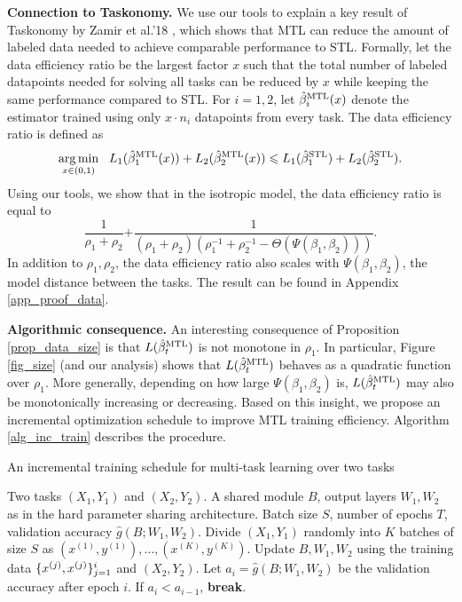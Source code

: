 \textbf{Connection to Taskonomy.} We use our tools to explain a key result of Taskonomy by Zamir et al.'18 \cite{ZSSGM18}, which shows that MTL can reduce the amount of labeled data needed to achieve comparable performance to STL.
Formally, let the data efficiency ratio be the largest factor $x$ such that the total number of labeled datapoints needed for solving all tasks can be reduced by $x$ while keeping the same performance compared to STL.
For $i = 1, 2$, let $\hat{\beta}_i^{\text{MTL}}(x)$ denote the estimator trained using only $x \cdot n_i$ datapoints from every task.
The data efficiency ratio is defined as
\[ \operatorname*{arg\,min}_{x\in(0, 1)} ~~
		L_1(\hat{\beta}_1^{\text{MTL}}(x)) + L_2(\hat{\beta}_2^{\text{MTL}}(x))
		\leqslant L_1(\hat{\beta}_1^{\text{STL}}) + L_2(\hat{\beta}_2^{\text{STL}}). \]
Using our tools, we show that in the isotropic model, the data efficiency ratio is
equal to \[ \frac{1}{\rho_1 + \rho_2} {+ \frac{1}{(\rho_1 +\rho_2)(\rho_1^{-1} + \rho_2^{-1} - \Theta(\Psi(\beta_1, \beta_2)))}}. \]
In addition to $\rho_1,\rho_2$, the data efficiency ratio also scales with $\Psi(\beta_1, \beta_2)$, the model distance between the tasks.
The result can be found in Appendix \ref{app_proof_data}.

\textbf{Algorithmic consequence.} An interesting consequence of Proposition \ref{prop_data_size} is that $L(\hat{\beta}_t^{\text{MTL}})$ is not monotone in $\rho_1$.
In particular, Figure \ref{fig_size} (and our analysis) shows that $L(\hat{\beta}_t^{\text{MTL}})$ behaves as a quadratic function over $\rho_1$.
More generally, depending on how large $\Psi(\beta_1, \beta_2)$ is, $L(\hat{\beta}_t^{\text{MTL}})$ may also be monotonically increasing or decreasing.
Based on this insight, we propose an incremental optimization schedule to improve MTL training efficiency.
Algorithm \ref{alg_inc_train} describes the procedure.

\begin{algorithm}[!t]
	\caption{An incremental training schedule for multi-task learning over two tasks}
	\label{alg_inc_train}
	\begin{algorithmic}[1]
		\Input Two tasks $(X_1, Y_1)$ and $(X_2, Y_2)$.
		\Param A shared module $B$, output layers $W_1, W_2$ as in the hard parameter sharing architecture.
		\Req Batch size $S$, number of epochs $T$, validation accuracy $\hat{g}(B; W_1, W_2)$.
		\State Divide $(X_1, Y_1)$ randomly into $K$ batches of size $S$ as $(x^{(1)}, y^{(1)}), \dots, (x^{(K)}, y^{(K)})$.
				\State Update $B, W_1, W_2$ using the training data $\{x^{(j)}, x^{(j)}\}_{j=1}^i$ and  $(X_2, Y_2)$.
			\EndFor
		\State Let $a_i = \hat{g}(B; W_1, W_2)$ be the validation accuracy after epoch $i$.
			If $a_i < a_{i-1}$, \textbf{break}.
		\EndFor
	\end{algorithmic}
\end{algorithm}

